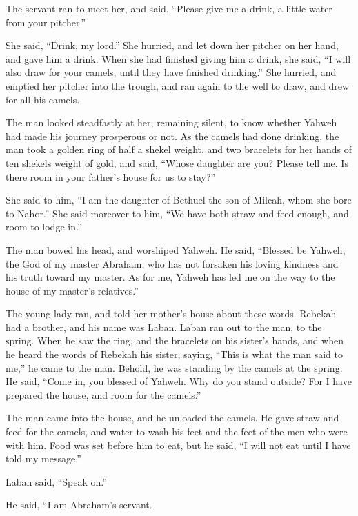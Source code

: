 {The servant ran to meet her, and said, “Please give me a drink, a little water from your pitcher.”
\par }{\PP {}She said, “Drink, my lord.” She hurried, and let down her pitcher on her hand, and gave him a drink.
When she had finished giving him a drink, she said, “I will also draw for your camels, until they have finished drinking.”
She hurried, and emptied her pitcher into the trough, and ran again to the well to draw, and drew for all his camels.
\par }{\PP {}The man looked steadfastly at her, remaining silent, to know whether Yahweh had made his journey prosperous or not.
As the camels had done drinking, the man took a golden ring of half a shekel weight, and two bracelets for her hands of ten shekels weight of gold,
and said, “Whose daughter are you? Please tell me. Is there room in your father’s house for us to stay?”
\par }{\PP {}She said to him, “I am the daughter of Bethuel the son of Milcah, whom she bore to Nahor.”
She said moreover to him, “We have both straw and feed enough, and room to lodge in.”
\par }{\PP {}The man bowed his head, and worshiped Yahweh.
He said, “Blessed be Yahweh, the God of my master Abraham, who has not forsaken his loving kindness and his truth toward my master. As for me, Yahweh has led me on the way to the house of my master’s relatives.”
\par }{\PP {}The young lady ran, and told her mother’s house about these words.
Rebekah had a brother, and his name was Laban. Laban ran out to the man, to the spring.
When he saw the ring, and the bracelets on his sister’s hands, and when he heard the words of Rebekah his sister, saying, “This is what the man said to me,” he came to the man. Behold, he was standing by the camels at the spring.
He said, “Come in, you blessed of Yahweh. Why do you stand outside? For I have prepared the house, and room for the camels.”
\par }{\PP {}The man came into the house, and he unloaded the camels. He gave straw and feed for the camels, and water to wash his feet and the feet of the men who were with him.
Food was set before him to eat, but he said, “I will not eat until I have told my message.”
\par }{\PP Laban said, “Speak on.”
\par }{\PP {}He said, “I am Abraham’s servant.
}
